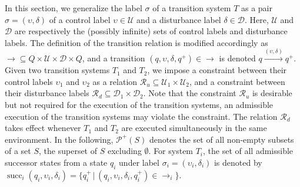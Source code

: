 In this section, we generalize the label $\sigma$ of a transition system $T$ as a pair $\sigma = (\upsilon, \delta)$ of a control label $\upsilon \in \mathcal{U}$ and a disturbance label $\delta \in \mathcal{D}$.
Here, $\mathcal{U}$ and $\mathcal{D}$ are respectively the (possibly infinite) sets of control labels and disturbance labels.
The definition of the transition relation is modified accordingly as $\rightarrow \subseteq Q \times \mathcal{U} \times \mathcal{D} \times Q$, and a transition $(q, \upsilon, \delta, q^{+}) \in \rightarrow$ is denoted $q \xrightarrow{(\upsilon, \delta)} q^{+}$.
Given two transition systems $T_{1}$ and $T_{2}$, we impose a constraint between their control labels $\upsilon_{1}$ and $\upsilon_2$ as a relation $\mathcal{R}_u \subseteq \mathcal{U}_1 \times \mathcal{U}_2$, and a constraint between their disturbance labels $\mathcal{R}_{d}\subseteq \mathcal{D}_1 \times \mathcal{D}_2$.
Note that the constraint $\mathcal{R}_{u}$ is desirable but not required for the execution of the transition systems, \ie an admissible execution of the transition systems may violate the constraint.
The relation $\mathcal{R}_{d}$ takes effect whenever $T_{1}$ and $T_{2}$ are executed simultaneously in the same environment.
In the following, $\mathcal{P}^{+}(S)$ denotes the set of all non-empty subsets of a set $S$, \ie the superset of $S$ excluding $\emptyset$.
For system $T_{i}$, the set of all admissible successor states from a state $q_{i}$ under label $\sigma_{i} = (\upsilon_{i}, \delta_{i})$ is denoted by $\operatorname{succ}_{i}(q_{i}, \upsilon_{i}, \delta_{i}) = \{q_{i}^{+} \,|\, (q_{i}, \upsilon_{i}, \delta_{i}, q_{i}^{+}) \in \rightarrow_{i}\}$.




